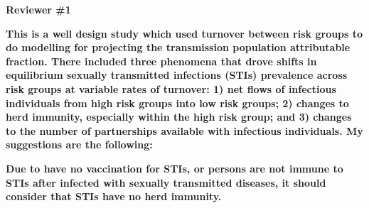 \newcommand{\comment}[1]{\par\textbf{#1}\par}
\newcommand{\reply}[1]{\par{#1}\par}
\renewcommand{\quote}[1]{\begin{quotation}\noindent\emph{#1}\end{quotation}}
\newcommand{\added}[1]{\textcolor{green!70!gray}{#1}}
\textbf{Reviewer \#1}
\comment{%
  This is a well design study which used turnover between risk groups to do modelling for projecting the transmission population attributable fraction.
  There included three phenomena that drove shifts in equilibrium sexually transmitted infections (STIs) prevalence across risk groups at variable rates of turnover:
  1) net flows of infectious individuals from high risk groups into low risk groups;
  2) changes to herd immunity, especially within the high risk group; and
  3) changes to the number of partnerships available with infectious individuals.
  My suggestions are the following:}
\comment{%
  Due to have no vaccination for STIs, or persons are not immune to STIs after infected with sexually transmitted diseases,
  it should consider that STIs have no herd immunity.}
